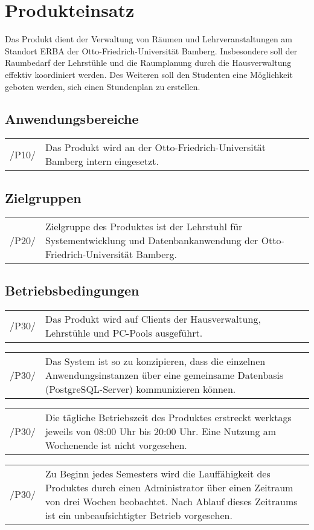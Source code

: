 \section{Produkteinsatz}
\label{sec:Produkteinsatz}
Das Produkt dient der Verwaltung von Räumen und Lehrveranstaltungen am Standort ERBA der Otto-Friedrich-Universität Bamberg. Insbesondere soll der Raumbedarf der Lehrstühle und die Raumplanung durch die Hausverwaltung effektiv koordiniert werden. Des Weiteren soll den Studenten eine Möglichkeit geboten werden, sich einen Stundenplan zu erstellen.

\subsection{Anwendungsbereiche}
\begin{tabular}{p{1.5cm}p{14.5cm}}	
	 /P10/& Das Produkt wird an der Otto-Friedrich-Universität Bamberg intern eingesetzt. \\[0.25cm]
\end{tabular}


\subsection{Zielgruppen}
\begin{tabular}{p{1.5cm}p{14.5cm}}	
	 /P20/& Zielgruppe des Produktes ist der Lehrstuhl für Systementwicklung und Datenbankanwendung der Otto-Friedrich-Universität Bamberg. \\[0.25cm]
\end{tabular}


\subsection{Betriebsbedingungen}
\begin{tabular}{p{1.5cm}p{14.5cm}}	
	 /P30/& Das Produkt wird auf Clients der Hausverwaltung, Lehrstühle und PC-Pools ausgeführt. \\[0.25cm]
\end{tabular}

\begin{tabular}{p{1.5cm}p{14.5cm}}	
	 /P30/& Das System ist so zu konzipieren, dass die einzelnen Anwendungsinstanzen über eine gemeinsame Datenbasis (PostgreSQL-Server) kommunizieren können. \\[0.25cm]
\end{tabular}

\begin{tabular}{p{1.5cm}p{14.5cm}}	
	 /P30/& Die tägliche Betriebszeit des Produktes erstreckt werktags jeweils von 08:00 Uhr bis 20:00 Uhr. Eine Nutzung am Wochenende ist nicht vorgesehen. \\[0.25cm]
\end{tabular}

\begin{tabular}{p{1.5cm}p{14.5cm}}	
	 /P30/& Zu Beginn jedes Semesters wird die Lauffähigkeit des Produktes durch einen Administrator über einen Zeitraum von drei Wochen beobachtet. Nach Ablauf dieses Zeitraums ist ein unbeaufsichtigter Betrieb vorgesehen. \\[0.25cm]
\end{tabular}
